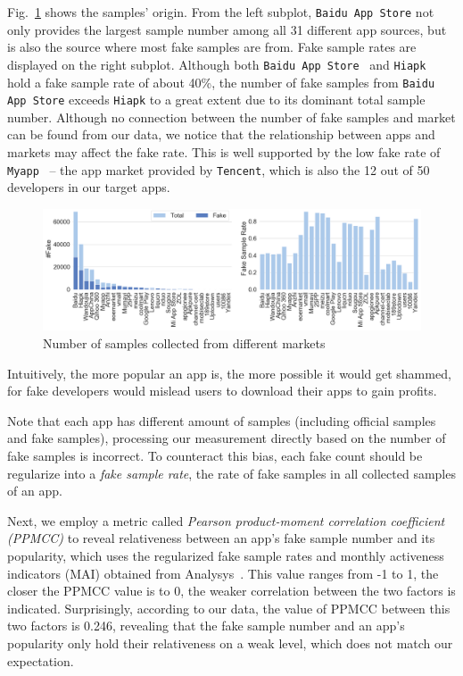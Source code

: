  Fig.~\ref{fig:Sample_source} shows the samples' origin.
From the left subplot, \texttt{Baidu App Store} not only provides the largest sample number among all 31 different app sources, but is also the source where most fake samples are from.
Fake sample rates are displayed on the right subplot.
Although both \texttt{Baidu App Store}~\cite{Baiduappstore} and \texttt{Hiapk}~\cite{Hiapk} hold a fake sample rate of about 40\%, the number of fake samples from \texttt{Baidu App Store} exceeds \texttt{Hiapk} to a great extent due to its dominant total sample number.
Although no connection between the number of fake samples and market can be found from our data, we notice that the relationship between apps and markets may affect the fake rate.
This is well supported by the low fake rate of \texttt{Myapp}~\cite{Myapp} -- the app market provided by \texttt{Tencent}, which is also the 12 out of 50 developers in our target apps.

\begin{figure}[htbp]
	\centering
  \setlength{\belowcaptionskip}{-10pt}
	\includegraphics[width=\textwidth]{./Figures/edwin-Number_of_samples_collected_markets_3.png}
	\caption{Number of samples collected from different markets}
	\label{fig:Sample_source}
\end{figure}

Intuitively, the more popular an app is, the more possible it would get shammed, for fake developers would mislead users to download their apps to gain profits.

Note that each app has different amount of samples (including official samples and fake samples), processing our measurement directly based on the number of fake samples is incorrect.
To counteract this bias, each fake count should be regularize into a \textit{fake sample rate}, the rate of fake samples in all collected samples of an app.

Next, we employ a metric called \textit{Pearson product-moment correlation coefficient (PPMCC)} to reveal relativeness between an app's fake sample number and its popularity, which uses the regularized fake sample rates and monthly activeness indicators (MAI) obtained from Analysys~\cite{yiguanqianfan}.
This value ranges from -1 to 1, the closer the PPMCC value is to 0, the weaker correlation between the two factors is indicated.
Surprisingly, according to our data, the value of PPMCC between this two factors is 0.246, revealing that the fake sample number and an app's popularity only hold their relativeness on a weak level, which does not match our expectation.

